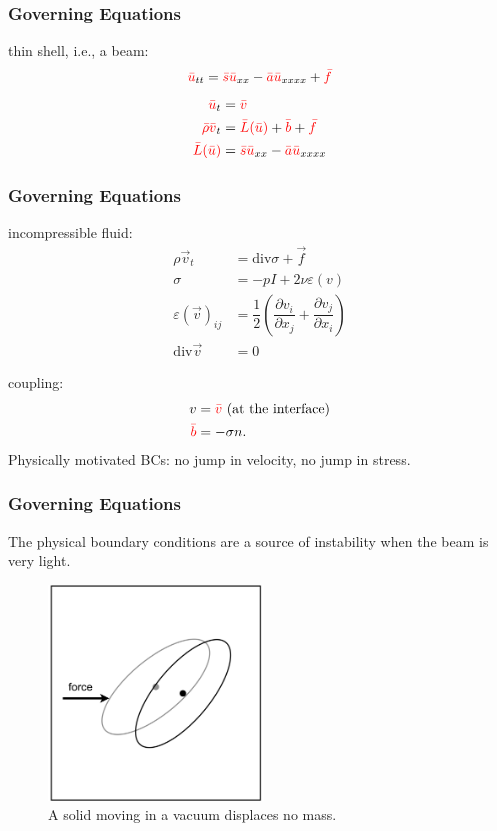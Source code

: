 \documentclass[8pt]{beamer}
\newcommand{\leftd}[1]{{\color{red} \bar{#1}}}
\newcommand{\leftdd}[2]{{\color{red} \bar{#1}(\bar{#2})}}
\newcommand{\divergence}{\mathrm{div}}
\begin{document}
\begin{frame}
    \frametitle{Governing Equations}
    thin shell, i.e., a beam:
    \begin{equation}
        \leftd{u}_{tt} = \leftd{s} \leftd{u}_{xx} - \leftd{a} \leftd{u}_{xxxx}
        + \leftd{f}
    \end{equation}
    \pause
    \begin{align}
        \leftd{u}_t              &= \leftd{v}                                 \\
        \leftd{\rho} \leftd{v}_t &= \leftdd{L}{u} + \leftd{b} + \leftd{f}     \\
        \leftdd{L}{u}            &= \leftd{s} \leftd{u}_{xx}
        - \leftd{a} \leftd{u}_{xxxx}
    \end{align}
\end{frame}

\begin{frame}
    \frametitle{Governing Equations}
    incompressible fluid:
    \begin{align}
        \rho \vec{v}_t &= \divergence \sigma + \vec{f}                        \\
        \sigma &= -p I + 2 \nu \varepsilon(v)                                 \\
        \varepsilon(\vec{v})_{ij} &= \dfrac{1}{2}
        \left(
        \dfrac{\partial v_i}{\partial x_j} +
        \dfrac{\partial v_j}{\partial x_i}
        \right)                                                               \\
        \divergence \vec{v} &= 0
    \end{align}

    \pause
    coupling:
    \begin{align}
        v &= \leftd{v} \text{ (at the interface)}                             \\
        \leftd{b} &= -\sigma n.
    \end{align}
    \pause
    Physically motivated BCs: no jump in velocity, no jump in stress.
\end{frame}

\begin{frame}
    \frametitle{Governing Equations}
    The physical boundary conditions are a source of instability when the beam
    is very light.

    \begin{figure}
        \centering
        \includegraphics[width=2.25in]{left.png}

        \caption{A solid moving in a vacuum displaces no mass.}
    \end{figure}
\end{frame}
\end{document}
